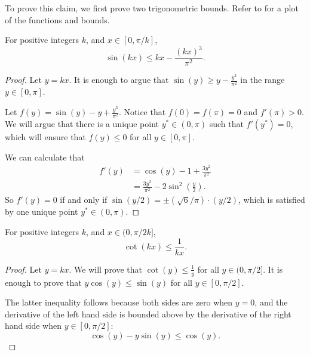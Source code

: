 \documentclass{toc}
\begin{document}
To prove this claim, we first prove two trigonometric bounds. Refer to  for a plot of the functions and bounds.

\begin{claim}
    \label{claim:center1}
    For positive integers $k$, and $x\in[0,\pi/k]$,
    \[\sin(kx)\le kx-\frac{(kx)^3}{\pi^2}. \]
\end{claim}

\begin{proof}
    Let $y=kx$. It is enough to argue that $\sin(y)\ge y-\frac{y^3}{\pi^2}$ in the range $y\in[0,\pi]$.
    
    Let $f(y)=\sin(y)-y+\frac{y^3}{\pi^2}$. Notice that $f(0)=f(\pi)=0$ and $f'(\pi)>0$. We will argue that there is a unique point $y^*\in (0,\pi)$ such that $f'(y^*)=0$, which will ensure that $f(y)\le 0$ for all $y\in [0,\pi]$.
    
    We can calculate that 
    \begin{align*}
        f'(y) &= \cos(y)-1+\frac{3y^2}{\pi^2}\\
        &= \frac{3y^2}{\pi^2}-2\sin^2\left(\frac{y}{2}\right).
    \end{align*}
    So $f'(y)=0$ if and only if $\sin(y/2)= \pm (\sqrt{6}/\pi)\cdot (y/2)$, which is satisfied by one unique point $y^*\in(0,\pi)$.
\end{proof}

\begin{claim}
    \label{claim:center2}
    For positive integers $k$, and $x\in (0,\pi/2k]$, 
    \[\cot(kx)\le \frac{1}{kx}. \]
\end{claim}

\begin{proof}
    Let $y=kx$. We will prove that $\cot(y)\le \frac{1}{y}$ for all $y\in (0,\pi/2]$. It is enough to prove that $y\cos(y)\le \sin(y)$ for all $y\in [0,\pi/2]$.
    
    The latter inequality follows because both sides are zero when $y=0$, and the derivative of the left hand side is bounded above by the derivative of the right hand side when $y\in [0,\pi/2]$:
    \[\cos(y)-y\sin(y)\le \cos(y).  \]
\end{proof}
\end{document}
